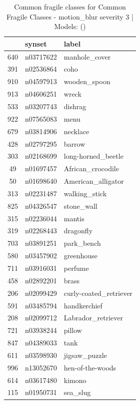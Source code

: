 \begin{table}
\caption{Common fragile classes for Common Fragile Classes - motion_blur severity 3 | Models: ()}
\label{tab:Common Fragile Classes - motion_blur severity 3_d41d8cd9}
\begin{tabular}{cll}
\toprule
 & synset & label \\
\midrule
640 & n03717622 & manhole_cover \\
391 & n02536864 & coho \\
910 & n04597913 & wooden_spoon \\
913 & n04606251 & wreck \\
533 & n03207743 & dishrag \\
922 & n07565083 & menu \\
679 & n03814906 & necklace \\
428 & n02797295 & barrow \\
303 & n02168699 & long-horned_beetle \\
49 & n01697457 & African_crocodile \\
50 & n01698640 & American_alligator \\
313 & n02231487 & walking_stick \\
825 & n04326547 & stone_wall \\
315 & n02236044 & mantis \\
319 & n02268443 & dragonfly \\
703 & n03891251 & park_bench \\
580 & n03457902 & greenhouse \\
711 & n03916031 & perfume \\
458 & n02892201 & brass \\
206 & n02099429 & curly-coated_retriever \\
591 & n03485794 & handkerchief \\
208 & n02099712 & Labrador_retriever \\
721 & n03938244 & pillow \\
847 & n04389033 & tank \\
611 & n03598930 & jigsaw_puzzle \\
996 & n13052670 & hen-of-the-woods \\
614 & n03617480 & kimono \\
115 & n01950731 & sea_slug \\
\bottomrule
\end{tabular}
\end{table}
